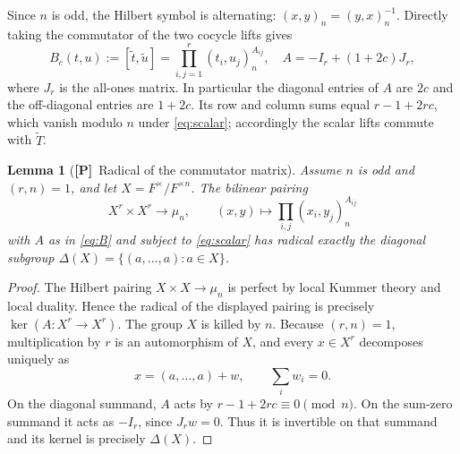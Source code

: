 \documentclass[11pt]{article}
\newcommand{\Ptag}{\textnormal{\textbf{[P]}}}
\theoremstyle{plain}
\newtheorem{lemma}[theorem]{Lemma}
\theoremstyle{definition}
\begin{document}
Since $n$ is odd, the Hilbert symbol is alternating:
$(x,y)_n=(y,x)_n^{-1}$.  Directly taking the commutator of the two
cocycle lifts gives
\begin{equation}\label{eq:B}
 B_c(t,u):=[\widetilde t,\widetilde u]
 =\prod_{i,j=1}^r(t_i,u_j)_n^{A_{ij}},
 \quad A=-I_r+(1+2c)J_r,
\end{equation}
where $J_r$ is the all-ones matrix.  In particular the diagonal
entries of $A$ are $2c$ and the off-diagonal entries are $1+2c$.
Its row and column sums equal $r-1+2rc$, which vanish modulo $n$
under \eqref{eq:scalar}; accordingly the scalar lifts commute with
$\widetilde T$.

\begin{lemma}[\Ptag\ Radical of the commutator matrix]\label{lem:rad}
Assume $n$ is odd and $(r,n)=1$, and let
$X=F^\times/F^{\times n}$.  The bilinear pairing
\[
 X^r\times X^r\longrightarrow\mu_n,
 \qquad (x,y)\longmapsto\prod_{i,j}(x_i,y_j)_n^{A_{ij}}
\]
with $A$ as in \eqref{eq:B} and subject to \eqref{eq:scalar}
has radical exactly the diagonal subgroup
$\Delta(X)=\{(a,\ldots,a):a\in X\}$.
\end{lemma}
\begin{proof}
The Hilbert pairing $X\times X\to\mu_n$ is perfect by local
Kummer theory and local duality.  Hence the radical of the displayed
pairing is precisely $\ker(A:X^r\to X^r)$.
The group $X$ is killed by $n$.  Because $(r,n)=1$, multiplication by
$r$ is an automorphism of $X$, and every $x\in X^r$ decomposes
uniquely as
\[
 x=(a,\ldots,a)+w,
 \qquad \sum_iw_i=0.
\]
On the diagonal summand, $A$ acts by
$r-1+2rc\equiv0\pmod n$.  On the sum-zero summand it acts as
$-I_r$, since $J_rw=0$.  Thus it is invertible on that summand and
its kernel is precisely $\Delta(X)$.
\end{proof}
\end{document}
